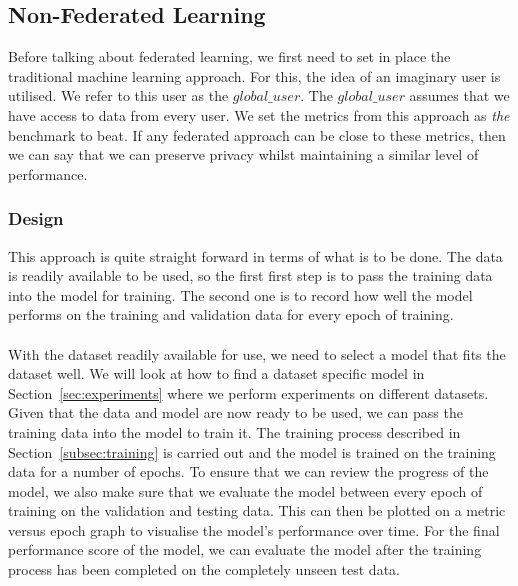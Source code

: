 \documentclass[12pt]{article}
\begin{document}
\subsection{Non-Federated Learning}\label{subsec:non-fedml}
Before talking about federated learning, we first need to set in place the traditional machine learning approach. For this, the idea of an imaginary user is utilised. We refer to this user as the $global\_user$. The $global\_user$ assumes that we have access to data from every user. We set the metrics from this approach as \textit{the} benchmark to beat. If any federated approach can be close to these metrics, then we can say that we can preserve privacy whilst maintaining a similar level of performance.
\subsubsection{Design}
This approach is quite straight forward in terms of what is to be done. The data is readily available to be used, so the first first step is to pass the training data into the model for training. The second one is to record how well the model performs on the training and validation data for every epoch of training.
\\\\
With the dataset readily available for use, we need to select a model that fits the dataset well. We will look at how to find a dataset specific model in Section~\ref{sec:experiments} where we perform experiments on different datasets. Given that the data and model are now ready to be used, we can pass the training data into the model to train it. The training process described in Section~\ref{subsec:training} is carried out and the model is trained on the training data for a number of epochs. To ensure that we can review the progress of the model, we also make sure that we evaluate the model between every epoch of training on the validation and testing data. This can then be plotted on a metric versus epoch graph to visualise the model's performance over time. For the final performance score of the model, we can evaluate the model after the training process has been completed on the completely unseen test data.
\end{document}
